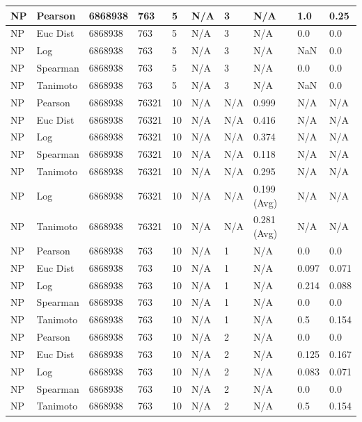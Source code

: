 \documentclass{article}
\begin{document}
\begin{longtable}{ |p{1.7cm}|p{1.9cm}|p{1.5cm}|p{1.5cm}|p{0.75cm}|p{0.75cm}|p{0.75cm}|p{0.75cm}|p{1.5cm}|p{1.5cm}|}
    NP & Pearson & 6868938 & 763 & 5 &  N/A & 3 & N/A & 1.0 & 0.25  \\ \hline
    NP & Euc Dist & 6868938 & 763 & 5 & N/A &  3 & N/A &0.0 & 0.0   \\ \hline
    NP & Log & 6868938 & 763 & 5 &  N/A &  3 & N/A & NaN & 0.0  \\ \hline
    NP & Spearman & 6868938 & 763 & 5 & N/A &  3 & N/A &0.0 & 0.0 \\ \hline
    NP & Tanimoto & 6868938 & 763 & 5 & N/A &  3 & N/A & NaN & 0.0 \\ \hline
    
    NP & Pearson & 6868938 & 76321 & 10 &  N/A & N/A & 0.999 & N/A & N/A  \\ \hline
    NP & Euc Dist & 6868938 & 76321 & 10 & N/A & N/A & 0.416 & N/A & N/A   \\ \hline
    NP & Log & 6868938 & 76321 & 10 &  N/A & N/A & 0.374 & N/A & N/A  \\ \hline
    NP & Spearman & 6868938 & 76321 & 10 & N/A & N/A & 0.118 & N/A & N/A \\ \hline
    NP & Tanimoto & 6868938 & 76321 & 10 & N/A & N/A & 0.295 & N/A & N/A \\ \hline
    NP & Log & 6868938 & 76321 & 10 & N/A & N/A & 0.199 (Avg) & N/A & N/A \\ \hline
    NP & Tanimoto & 6868938 & 76321 & 10 & N/A & N/A & 0.281 (Avg) & N/A & N/A \\ \hline
    
    NP & Pearson & 6868938 & 763 & 10 &  N/A & 1 & N/A & 0.0 & 0.0  \\ \hline
    NP & Euc Dist & 6868938 & 763 & 10 & N/A & 1 & N/A &0.097 & 0.071   \\ \hline
    NP & Log & 6868938 & 763 & 10 &  N/A & 1 & N/A & 0.214 & 0.088  \\ \hline
    NP & Spearman & 6868938 & 763 & 10 & N/A & 1 & N/A &0.0 & 0.0 \\ \hline
    NP & Tanimoto & 6868938 & 763 & 10 & N/A & 1 & N/A & 0.5 & 0.154 \\ \hline
    
    NP & Pearson & 6868938 & 763 & 10 &  N/A & 2 & N/A & 0.0 & 0.0  \\ \hline
    NP & Euc Dist & 6868938 & 763 & 10 & N/A &  2 & N/A &0.125 & 0.167   \\ \hline
    NP & Log & 6868938 & 763 & 10 &  N/A &  2 & N/A & 0.083 & 0.071 \\ \hline
    NP & Spearman & 6868938 & 763 & 10 & N/A &  2 & N/A & 0.0 & 0.0 \\ \hline
    NP & Tanimoto & 6868938 & 763 & 10 & N/A &  2 & N/A & 0.5 & 0.154 \\ \hline
    

\end{longtable}
\end{document}
